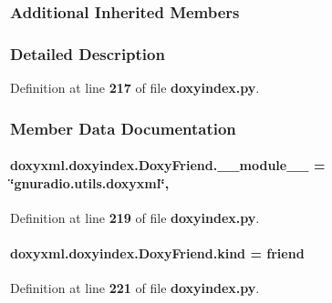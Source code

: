 \subsubsection*{Additional Inherited Members}


\subsubsection{Detailed Description}


Definition at line {\bf 217} of file {\bf doxyindex.\+py}.



\subsubsection{Member Data Documentation}
\paragraph[{\+\_\+\+\_\+module\+\_\+\+\_\+}]{ doxyxml.\+doxyindex.\+Doxy\+Friend.\+\_\+\+\_\+module\+\_\+\+\_\+ = \char`\"{}gnuradio.\+utils.\+doxyxml\char`\"{}\hspace{0.3cm}{\ttfamily [static]}, {\ttfamily [private]}}\label{classdoxyxml_1_1doxyindex_1_1DoxyFriend_acc7c490f7983f09460ea4d140eeab977}


Definition at line {\bf 219} of file {\bf doxyindex.\+py}.

\paragraph[{kind}]{ doxyxml.\+doxyindex.\+Doxy\+Friend.\+kind = \textquotesingle{}friend\textquotesingle{}\hspace{0.3cm}{\ttfamily [static]}}\label{classdoxyxml_1_1doxyindex_1_1DoxyFriend_aeacf91b1108afd431ac93fe200c71239}


Definition at line {\bf 221} of file {\bf doxyindex.\+py}.



